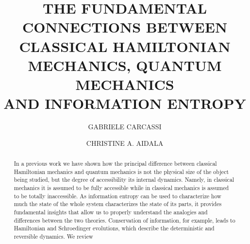 \documentclass{ws-ijqi}
\begin{document}
\catchline{}{}{}{}{}

\title{THE FUNDAMENTAL CONNECTIONS BETWEEN CLASSICAL HAMILTONIAN MECHANICS, QUANTUM MECHANICS \\ AND INFORMATION ENTROPY}

\author{GABRIELE CARCASSI}

\address{Physics Department, University of Michigan, 450 Church Street\\
Ann Arbor, MI 48109-1040,
United States\\
carcassi@umich.edu}

\author{CHRISTINE A. AIDALA}

\address{Physics Department, University of Michigan, 450 Church Street\\
Ann Arbor, MI 48109-1040,
United States\\
caidala@umich.edu}

\maketitle

\begin{history}
\end{history}

\begin{abstract}
In a previous work we have shown how the principal difference between classical Hamiltonian mechanics and quantum mechanics is not the physical size of the object being studied, but the degree of accessibility its internal dynamics. Namely, in classical mechanics it is assumed to be fully accessible while in classical mechanics is assumed to be totally inaccessible. As information entropy can be used to characterize how much the state of the whole system characterizes the state of its parts, it provides fundamental insights that allow us to properly understand the analogies and differences between the two theories. Conservation of information, for example, leads to Hamiltonian and Schroedinger evolutions, which describe the deterministic and reversible dynamics. We review
\end{abstract}


\end{document}
